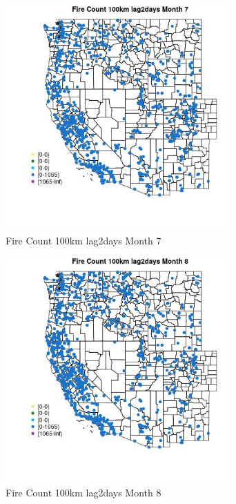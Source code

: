 \begin{figure} 
\centering  
\includegraphics[width=0.77\textwidth]{Code_Outputs/Report_ML_input_PM25_Step4_part_f_de_duplicated_aves_prioritize_24hr_obswNAs_MapObsMo7Fire_Count_100km_lag2days.jpg} 
\caption{\label{fig:Report_ML_input_PM25_Step4_part_f_de_duplicated_aves_prioritize_24hr_obswNAsMapObsMo7Fire_Count_100km_lag2days}Fire Count 100km lag2days Month 7} 
\end{figure} 
 

\clearpage 

\begin{figure} 
\centering  
\includegraphics[width=0.77\textwidth]{Code_Outputs/Report_ML_input_PM25_Step4_part_f_de_duplicated_aves_prioritize_24hr_obswNAs_MapObsMo8Fire_Count_100km_lag2days.jpg} 
\caption{\label{fig:Report_ML_input_PM25_Step4_part_f_de_duplicated_aves_prioritize_24hr_obswNAsMapObsMo8Fire_Count_100km_lag2days}Fire Count 100km lag2days Month 8} 
\end{figure} 
 

